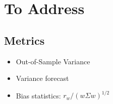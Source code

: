 \documentclass{article}
\begin{document}






\section{To Address}

\subsection{Metrics}

\begin{itemize}
	\item Out-of-Sample Variance
	\item Variance forecast
	\item Bias statistics: $r_w / (w\Sigma w)^{1/2}$
\end{itemize}
\end{document}
